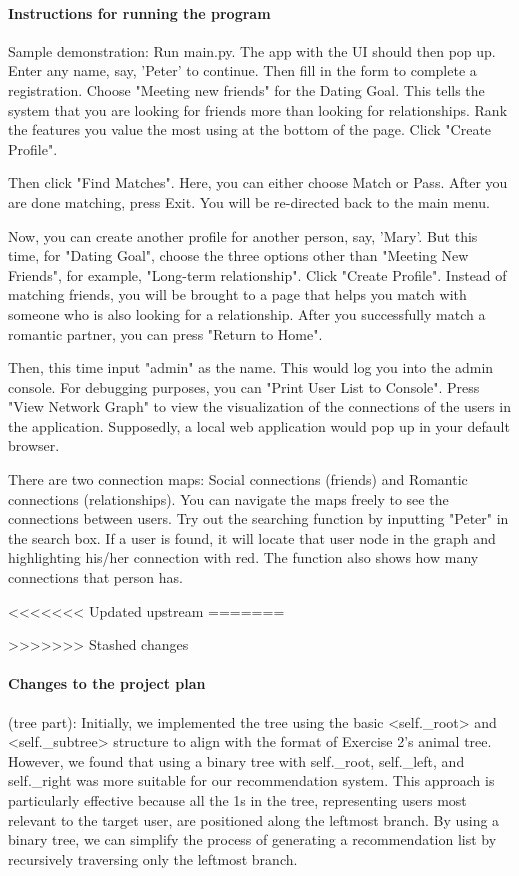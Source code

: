 \documentclass[fontsize=11pt]{article}
\begin{document}
\paragraph{Instructions for running the program}
Sample demonstration: Run main.py. The app with the UI should then pop up. Enter any name, say, 'Peter' to continue. Then fill in the form to complete a registration. Choose "Meeting new friends" for the Dating Goal. This tells the system that you are looking for friends more than looking for relationships. Rank the features you value the most using at the bottom of the page. Click "Create Profile".

Then click "Find Matches". Here, you can either choose Match or Pass. After you are done matching, press Exit. You will be re-directed back to the main menu.

Now, you can create another profile for another person, say, 'Mary'. But this time, for "Dating Goal", choose the three options other than "Meeting New Friends", for example, "Long-term relationship". Click "Create Profile". Instead of matching friends, you will be brought to a page that helps you match with someone who is also looking for a relationship. After you successfully match a romantic partner, you can press "Return to Home".

Then, this time input "admin" as the name. This would log you into the admin console. For debugging purposes, you can "Print User List to Console". Press "View Network Graph" to view the visualization of the connections of the users in the application. Supposedly, a local web application would pop up in your default browser.

There are two connection maps: Social connections (friends) and Romantic connections (relationships). You can navigate the maps freely to see the connections between users. Try out the searching function by inputting "Peter" in the search box. If a user is found, it will locate that user node in the graph and highlighting his/her connection with red. The function also shows how many connections that person has.



<<<<<<< Updated upstream
=======

>>>>>>> Stashed changes
\paragraph{Changes to the project plan}
(tree part): Initially, we implemented the tree using the basic <self._root> and <self._subtree> structure to align with the format of Exercise 2's animal tree. However, we found that using a binary tree with self._root, self._left, and self._right was more suitable for our recommendation system. This approach is particularly effective because all the 1s in the tree, representing users most relevant to the target user, are positioned along the leftmost branch. By using a binary tree, we can simplify the process of generating a recommendation list by recursively traversing only the leftmost branch.
\end{document}
